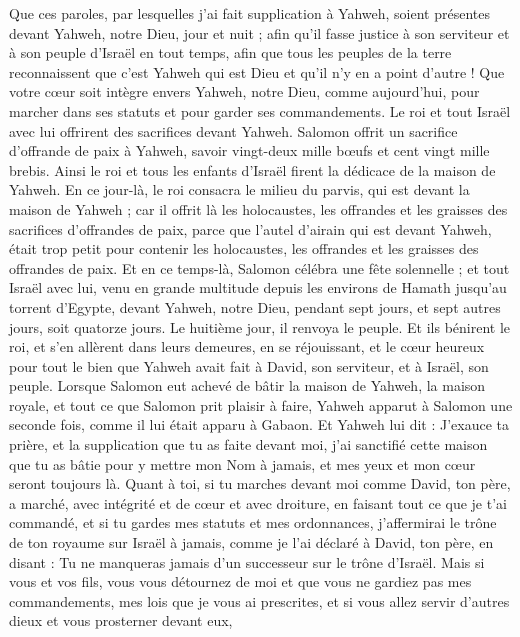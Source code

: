\begin{multicols}{2}
Que ces paroles, par lesquelles j'ai fait supplication à Yahweh, soient présentes devant Yahweh, notre Dieu, jour et nuit ; afin qu'il fasse justice à son serviteur et à son peuple d’Israël en tout temps,
afin que tous les peuples de la terre reconnaissent que c'est Yahweh qui est Dieu et qu'il n'y en a point d'autre !
Que votre cœur soit intègre envers Yahweh, notre Dieu, comme aujourd'hui, pour marcher dans ses statuts et pour garder ses commandements.
Le roi et tout Israël avec lui offrirent des sacrifices devant Yahweh.
Salomon offrit un sacrifice d'offrande de paix à Yahweh, savoir vingt-deux mille bœufs et cent vingt mille brebis. Ainsi le roi et tous les enfants d'Israël firent la dédicace de la maison de Yahweh.
En ce jour-là, le roi consacra le milieu du parvis, qui est devant la maison de Yahweh ; car il offrit là les holocaustes, les offrandes et les graisses des sacrifices d’offrandes de paix, parce que l'autel d'airain qui est devant Yahweh, était trop petit pour contenir les holocaustes, les offrandes et les graisses des offrandes de paix.
Et en ce temps-là, Salomon célébra une fête solennelle ; et tout Israël avec lui, venu en grande multitude depuis les environs de Hamath jusqu'au torrent d'Egypte, devant Yahweh, notre Dieu, pendant sept jours, et sept autres jours, soit quatorze jours.
Le huitième jour, il renvoya le peuple. Et ils bénirent le roi, et s'en allèrent dans leurs demeures, en se réjouissant, et le cœur heureux pour tout le bien que Yahweh avait fait à David, son serviteur, et à Israël, son peuple.
\VerseOne{}Lorsque Salomon eut achevé de bâtir la maison de Yahweh, la maison royale, et tout ce que Salomon prit plaisir à faire,
Yahweh apparut à Salomon une seconde fois, comme il lui était apparu à Gabaon.
Et Yahweh lui dit : J'exauce ta prière, et la supplication que tu as faite devant moi, j'ai sanctifié cette maison que tu as bâtie pour y mettre mon Nom à jamais, et mes yeux et mon cœur seront toujours là.
Quant à toi, si tu marches devant moi comme David, ton père, a marché, avec intégrité et de cœur et avec droiture, en faisant tout ce que je t'ai commandé, et si tu gardes mes statuts et mes ordonnances,
j’affermirai le trône de ton royaume sur Israël à jamais, comme je l’ai déclaré à David, ton père, en disant : Tu ne manqueras jamais d’un successeur sur le trône d'Israël.
Mais si vous et vos fils, vous vous détournez de moi et que vous ne gardiez pas mes commandements, mes lois que je vous ai prescrites, et si vous allez servir d'autres dieux et vous prosterner devant eux,

\end{multicols}
